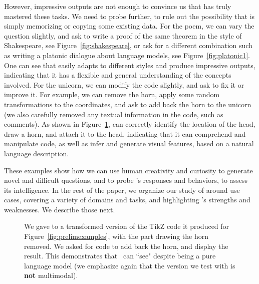     However, impressive outputs are not enough to convince us that {\DV} has truly mastered these tasks. We need to probe further, to rule out the possibility that {\DV} is simply memorizing or copying some existing data. For the poem, we can vary the question slightly, and ask {\DV} to write a proof of the same theorem in the style of Shakespeare, see Figure~\ref{fig:shakespeare}, or ask for a different combination such as writing a platonic dialogue about language models, see Figure~\ref{fig:platonic1}. One can see that {\DV} easily adapts to different styles and produce impressive outputs, indicating that it has a flexible and general understanding of the concepts involved. For the unicorn, we can modify the code slightly, and ask {\DV} to fix it or improve it. For example, we can remove the horn, apply some random transformations to the coordinates, and ask {\DV} to add back the horn to the unicorn (we also carefully removed any textual information in the code, such as comments). As shown in Figure~\ref{fig:unicorn2}, {\DV} can correctly identify the location of the head, draw a horn, and attach it to the head, indicating that it can comprehend and manipulate code, as well as infer and generate visual features, based on a natural language description.
    \newline
    
    These examples show how we can use human creativity and curiosity to generate novel and difficult questions, and to probe \DV's responses and behaviors, to assess its intelligence. In the rest of the paper, we organize our study of {\DV} around use cases, covering a variety of domains and tasks, and highlighting \DV's strengths and weaknesses. We describe those next.
    
    \begin{figure}
    \centering
    \caption{We gave to {\DV} a transformed version of the TikZ code it produced for Figure~\ref{fig:prelimexamples}, with the part drawing the horn removed. We asked for code to add back the horn, and display the result. This demonstrates that \DV\ can ``see" despite being a pure language model (we emphasize again that the version we test with is \textbf{not} multimodal).}
    \label{fig:unicorn2}
    \end{figure}
    
